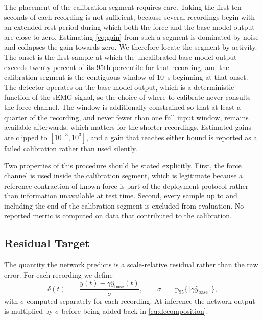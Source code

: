 The placement of the calibration segment requires care. Taking the first ten
seconds of each recording is not sufficient, because several recordings begin
with an extended rest period during which both the force and the base model
output are close to zero. Estimating \eqref{eq:gain} from such a segment is
dominated by noise and collapses the gain towards zero. We therefore locate the
segment by activity. The onset is the first sample at which the uncalibrated
base model output exceeds twenty percent of its 95th percentile for that
recording, and the calibration segment is the contiguous window of
\SI{10}{\second} beginning at that onset. The detector operates on the base model
output, which is a deterministic function of the sEMG signal, so the choice of
where to calibrate never consults the force channel. The window is additionally
constrained so that at least a quarter of the recording, and never fewer than one
full input window, remains available afterwards, which matters for the shorter
recordings. Estimated gains are clipped to $[10^{-3}, 10^{3}]$, and a gain that
reaches either bound is reported as a failed calibration rather than used
silently.

Two properties of this procedure should be stated explicitly. First, the force
channel is used inside the calibration segment, which is legitimate because a
reference contraction of known force is part of the deployment protocol rather
than information unavailable at test time. Second, every sample up to and
including the end of the calibration segment is excluded from evaluation. No
reported metric is computed on data that contributed to the calibration.

\subsection{Residual Target}
\label{sec:target}

The quantity the network predicts is a scale-relative residual rather than the
raw error. For each recording we define
\begin{equation}
  \delta(t) \;=\; \frac{y(t) - \gamma \hat{y}_{\mathrm{base}}(t)}{\sigma},
  \qquad
  \sigma \;=\; \mathrm{p}_{95}\big\{\,\big|\gamma \hat{y}_{\mathrm{base}}\big|\,\big\},
  \label{eq:target}
\end{equation}
with $\sigma$ computed separately for each recording. At inference the network
output is multiplied by $\sigma$ before being added back in
\eqref{eq:decomposition}.

